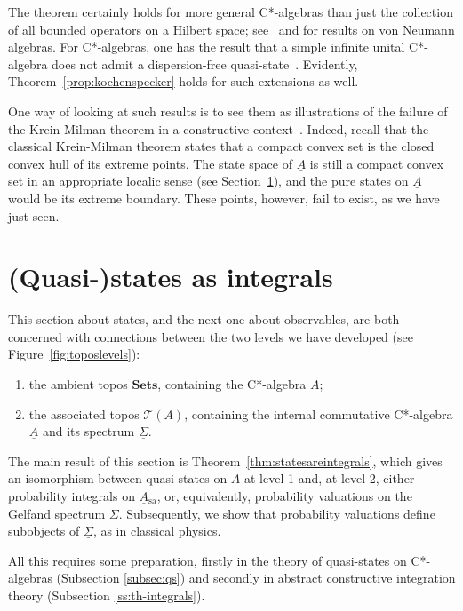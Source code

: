 \documentclass[11pt]{article}
\newcommand{\ca}{C*-algebra} \newcommand{\jba}{JB-algebra}
\newcommand{\alg}[1]{\ensuremath{#1}}
\newcommand{\functor}[1]{\ensuremath{\underline{#1}}}
\newcommand{\Cat}[1]{\ensuremath{\mathrm{\textbf{#1}}}}
\newcommand{\Set}{\Cat{Sets}\xspace}
\newcommand{\asstopos}{\ensuremath{\mathcal{T}}}
\newcommand{\sa}{\ensuremath{_{\mathrm{sa}}}}
\newcommand{\uA}{\underline{A}}
\newcommand{\ulS}{\functor{\Sigma}}
\begin{document}
The  theorem certainly holds for more general C*-algebras than
just the collection of all bounded operators on a Hilbert space;
see~\cite{doering:KS} and \cite{HLSSyn} for results on von Neumann algebras.
For C*-algebras, one has the result that a simple infinite unital C*-algebra
does not admit a dispersion-free quasi-state~\cite{Hamhalter}. Evidently,
Theorem~\ref{prop:kochenspecker} holds for such extensions as well.

One way of looking at such results is to see them as
 illustrations of the failure of the Krein-Milman theorem in a constructive
context~\cite{Mulvey:Krein-Milman}. Indeed, recall that the classical
Krein-Milman
theorem states that a compact convex set is the closed convex hull of its
extreme points. The state space of $\uA$ is still a compact convex set in an
appropriate localic sense (see Section~\ref{sec:statesasintegrals}), and the
pure states on $\uA$
would be its extreme boundary. These points,
however, fail to exist, as we have just seen.
\section{(Quasi-)states as integrals}
\label{sec:statesasintegrals}
This section about states, and the next one about observables, are both
concerned with connections between
the two levels we have developed (see Figure~\ref{fig:toposlevels}):
\begin{enumerate}
  \item the ambient topos $\Set$, containing the C*-algebra
    $\alg{A}$;
  \item the associated topos $\asstopos(\alg{A})$, containing the internal
    commutative C*-algebra $\functor{\alg{A}}$ and its
    spectrum $\ulS$.
\end{enumerate}
The main result of this section is Theorem~\ref{thm:statesareintegrals}, which
gives
 an isomorphism
between quasi-states on $\alg{A}$ at level 1 and,  at level 2,  either
probability integrals on $\uA\sa$, or, equivalently, probability
valuations on the Gelfand spectrum $\ulS$.
Subsequently,  we show that probability  valuations
 define subobjects of  $\ulS$, as in classical physics.

 All this requires some preparation, firstly in the theory of quasi-states on
\ca s
 (Subsection \ref{subsec:qs}) and secondly in
 abstract constructive integration theory (Subsection \ref{ss:th-integrals}).
\end{document}
